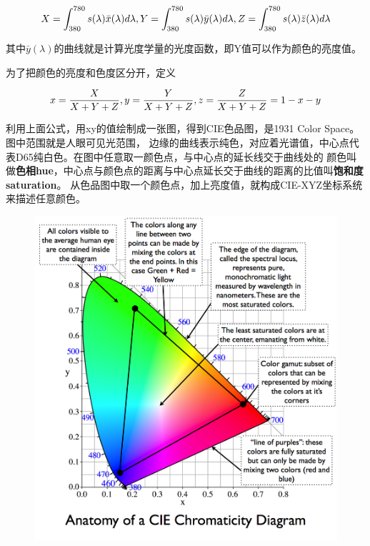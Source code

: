 \begin{align*}
    X = \int_{380}^{780}s(\lambda)\bar{x}(\lambda)d\lambda, \newline
    Y = \int_{380}^{780}s(\lambda)\bar{y}(\lambda)d\lambda, \newline
    Z = \int_{380}^{780}s(\lambda)\bar{z}(\lambda)d\lambda
\end{align*}

其中$\bar{y}(\lambda)$的曲线就是计算光度学量的光度函数，即Y值可以作为颜色的亮度值。

为了把颜色的亮度和色度区分开，定义

\begin{align*}
    x = \frac{X}{X+Y+Z}, \newline
    y = \frac{Y}{X+Y+Z}, \newline
    z = \frac{Z}{X+Y+Z} = 1 -x - y
\end{align*}

利用上面公式，用xy的值绘制成一张图，得到CIE色品图，是1931 Color Space。图中范围就是人眼可见光范围，
边缘的曲线表示纯色，对应着光谱值，中心点代表D65纯白色。在图中任意取一颜色点，与中心点的延长线交于曲线处的
颜色叫做\textbf{色相hue}，中心点与颜色点的距离与中心点延长交于曲线的距离的比值叫\textbf{饱和度saturation}。
从色品图中取一个颜色点，加上亮度值，就构成CIE-XYZ坐标系统来描述任意颜色。

\begin{figure}[h]
    \centering
    \includegraphics[width=1\textwidth]{images/anatomy-of-a-cie-1931-color-space.png}
\end{figure}

